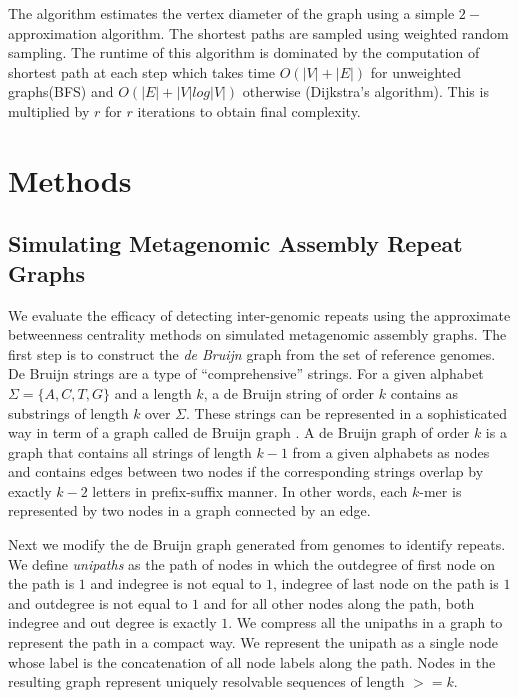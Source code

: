 \documentclass[runningheads,a4paper]{llncs}
\begin{document}
The algorithm estimates the vertex diameter of the graph using a simple $2-$approximation algorithm. The shortest paths are sampled using weighted random sampling. The runtime of this algorithm is dominated by the computation of shortest path at each step which takes time $O(|V| + |E|)$ for unweighted graphs(BFS) and $O(|E| + |V|log|V|)$ otherwise (Dijkstra's algorithm). This is multiplied by $r$ for $r$ iterations to obtain final complexity.


\section{Methods}


\subsection*{Simulating Metagenomic Assembly Repeat Graphs}

We evaluate the efficacy of detecting inter-genomic repeats using the approximate betweenness centrality methods on simulated metagenomic assembly graphs.
The first step is to construct the \textit{de Bruijn} graph from the set of reference genomes.
De Bruijn strings are a type of ``comprehensive'' strings. For a given alphabet $\Sigma = \{A,C,T,G\}$ and a length $k$, a de Bruijn string of order $k$ contains as substrings of length $k$ over $\Sigma$. These strings can be represented in a sophisticated way in term of a graph called de Bruijn graph \cite{debruijn}. A de Bruijn graph of order $k$ is a graph that contains all strings of length $k-1$ from a given alphabets as nodes and contains edges between two nodes if the corresponding strings overlap by exactly $k-2$ letters in prefix-suffix manner. In other words, each $k$-mer is represented by two nodes in a graph connected by an edge. 

Next we modify the de Bruijn graph generated from genomes to identify repeats. We define \textit{unipaths} as the path of nodes in which the outdegree of first node on the path is $1$ and indegree is not equal to $1$, indegree of last node on the path is $1$ and outdegree is not equal to $1$ and for all other nodes along the path, both indegree and out degree is exactly $1$. We compress all the unipaths in a graph to represent the path in a compact way. We represent the unipath as a single node whose label is the concatenation of all node labels along the path.
Nodes in the resulting graph represent uniquely resolvable sequences of length $>= k$.
\end{document}
